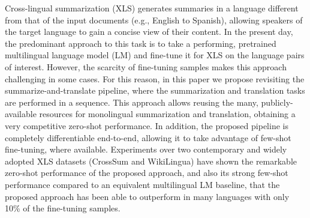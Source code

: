 Cross-lingual summarization (XLS) generates summaries in a language different from that of the input documents (e.g., English to Spanish), allowing speakers of the target language to gain a concise view of their content. In the present day, the predominant approach to this task is to take a performing, pretrained multilingual language model (LM) and fine-tune it for XLS on the language pairs of interest. However, the scarcity of fine-tuning samples makes this approach challenging in some cases. For this reason, in this paper we propose revisiting the summarize-and-translate pipeline, where the summarization and translation tasks are performed in a sequence. This approach allows reusing the many, publicly-available resources for monolingual summarization and translation, obtaining a very competitive zero-shot performance. In addition, the proposed pipeline is completely differentiable end-to-end, allowing it to take advantage of few-shot fine-tuning, where available. Experiments over two contemporary and widely adopted XLS datasets (CrossSum and WikiLingua) have shown the remarkable zero-shot performance of the proposed approach, and also its strong few-shot performance compared to an equivalent multilingual LM baseline, that the proposed approach has been able to outperform in many languages with only 10\% of the fine-tuning samples.